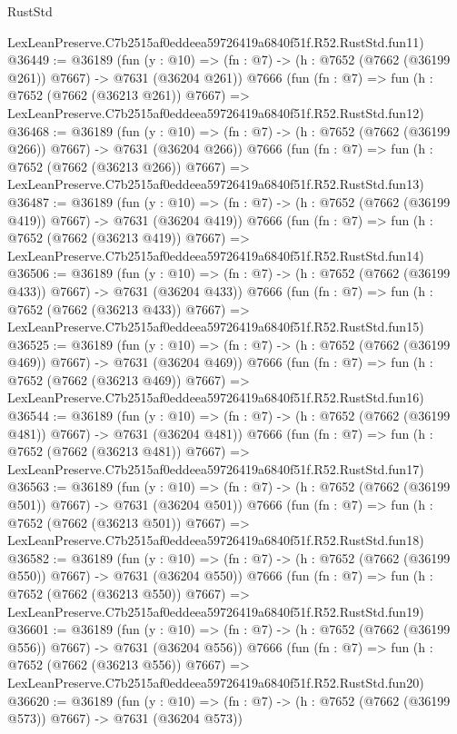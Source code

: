 \begin{lexlean}{RustStd}
\begin{coremodule}
    LexLeanPreserve.C7b2515af0eddeea59726419a6840f51f.R52.RustStd.fun11)
@36449 := @36189
    (fun (y : @10) => (fn : @7) -> (h : @7652 (@7662 (@36199 @261)) @7667) -> @7631 (@36204 @261))
    @7666
    (fun (fn : @7) =>
    fun (h : @7652 (@7662 (@36213 @261)) @7667) =>
    LexLeanPreserve.C7b2515af0eddeea59726419a6840f51f.R52.RustStd.fun12)
@36468 := @36189
    (fun (y : @10) => (fn : @7) -> (h : @7652 (@7662 (@36199 @266)) @7667) -> @7631 (@36204 @266))
    @7666
    (fun (fn : @7) =>
    fun (h : @7652 (@7662 (@36213 @266)) @7667) =>
    LexLeanPreserve.C7b2515af0eddeea59726419a6840f51f.R52.RustStd.fun13)
@36487 := @36189
    (fun (y : @10) => (fn : @7) -> (h : @7652 (@7662 (@36199 @419)) @7667) -> @7631 (@36204 @419))
    @7666
    (fun (fn : @7) =>
    fun (h : @7652 (@7662 (@36213 @419)) @7667) =>
    LexLeanPreserve.C7b2515af0eddeea59726419a6840f51f.R52.RustStd.fun14)
@36506 := @36189
    (fun (y : @10) => (fn : @7) -> (h : @7652 (@7662 (@36199 @433)) @7667) -> @7631 (@36204 @433))
    @7666
    (fun (fn : @7) =>
    fun (h : @7652 (@7662 (@36213 @433)) @7667) =>
    LexLeanPreserve.C7b2515af0eddeea59726419a6840f51f.R52.RustStd.fun15)
@36525 := @36189
    (fun (y : @10) => (fn : @7) -> (h : @7652 (@7662 (@36199 @469)) @7667) -> @7631 (@36204 @469))
    @7666
    (fun (fn : @7) =>
    fun (h : @7652 (@7662 (@36213 @469)) @7667) =>
    LexLeanPreserve.C7b2515af0eddeea59726419a6840f51f.R52.RustStd.fun16)
@36544 := @36189
    (fun (y : @10) => (fn : @7) -> (h : @7652 (@7662 (@36199 @481)) @7667) -> @7631 (@36204 @481))
    @7666
    (fun (fn : @7) =>
    fun (h : @7652 (@7662 (@36213 @481)) @7667) =>
    LexLeanPreserve.C7b2515af0eddeea59726419a6840f51f.R52.RustStd.fun17)
@36563 := @36189
    (fun (y : @10) => (fn : @7) -> (h : @7652 (@7662 (@36199 @501)) @7667) -> @7631 (@36204 @501))
    @7666
    (fun (fn : @7) =>
    fun (h : @7652 (@7662 (@36213 @501)) @7667) =>
    LexLeanPreserve.C7b2515af0eddeea59726419a6840f51f.R52.RustStd.fun18)
@36582 := @36189
    (fun (y : @10) => (fn : @7) -> (h : @7652 (@7662 (@36199 @550)) @7667) -> @7631 (@36204 @550))
    @7666
    (fun (fn : @7) =>
    fun (h : @7652 (@7662 (@36213 @550)) @7667) =>
    LexLeanPreserve.C7b2515af0eddeea59726419a6840f51f.R52.RustStd.fun19)
@36601 := @36189
    (fun (y : @10) => (fn : @7) -> (h : @7652 (@7662 (@36199 @556)) @7667) -> @7631 (@36204 @556))
    @7666
    (fun (fn : @7) =>
    fun (h : @7652 (@7662 (@36213 @556)) @7667) =>
    LexLeanPreserve.C7b2515af0eddeea59726419a6840f51f.R52.RustStd.fun20)
@36620 := @36189
    (fun (y : @10) => (fn : @7) -> (h : @7652 (@7662 (@36199 @573)) @7667) -> @7631 (@36204 @573))

\end{coremodule}
\end{lexlean}
